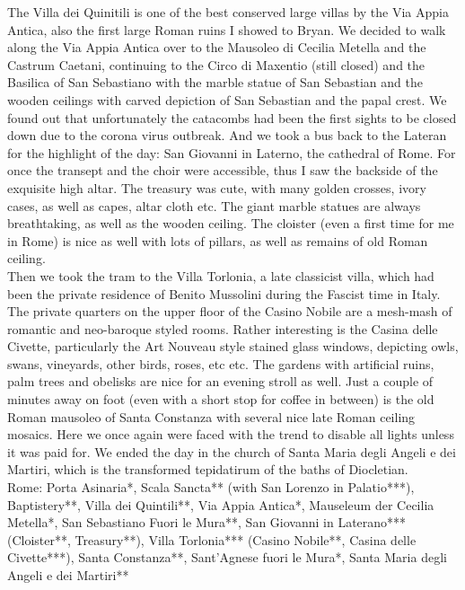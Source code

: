The Villa dei Quinitili is one of the best conserved large villas by the Via Appia Antica, also the first large Roman ruins I showed to Bryan. We decided to walk along the Via Appia Antica over to the Mausoleo di Cecilia Metella and the Castrum Caetani, continuing to the Circo di Maxentio (still closed) and the Basilica of San Sebastiano with the marble statue of San Sebastian and the wooden ceilings with carved depiction of San Sebastian and the papal crest. We found out that unfortunately the catacombs had been the first sights to be closed down due to the corona virus outbreak. And we took a bus back to the Lateran for the highlight of the day: San Giovanni in Laterno, the cathedral of Rome. For once the transept and the choir were accessible, thus I saw the backside of the exquisite high altar. The treasury was cute, with many golden crosses, ivory cases, as well as capes, altar cloth etc. The giant marble statues are always breathtaking, as well as the wooden ceiling. The cloister (even a first time for me in Rome) is nice as well with lots of pillars, as well as remains of old Roman ceiling.\\
Then we took the tram to the Villa Torlonia, a late classicist villa, which had been the private residence of Benito Mussolini during the Fascist time in Italy. The private quarters on the upper floor of the Casino Nobile are a mesh-mash of romantic and neo-baroque styled rooms. Rather interesting is the Casina delle Civette, particularly the Art Nouveau style stained glass windows, depicting owls, swans, vineyards, other birds, roses, etc etc. The gardens with artificial ruins, palm trees and obelisks are nice for an evening stroll as well. Just a couple of minutes away on foot (even with a short stop for coffee in between) is the old Roman mausoleo of Santa Constanza with several nice late Roman ceiling mosaics. Here we once again were faced with the trend to disable all lights unless it was paid for. We ended the day in the church of Santa Maria degli Angeli e dei Martiri, which is the transformed tepidatirum of the baths of Diocletian.\\

Rome: Porta Asinaria*, Scala Sancta** (with San Lorenzo in Palatio***), Baptistery**, Villa dei Quintili**, Via Appia Antica*, Mauseleum der Cecilia Metella*, San Sebastiano Fuori le Mura**, San Giovanni in Laterano*** (Cloister**, Treasury**), Villa Torlonia*** (Casino Nobile**, Casina delle Civette***), Santa Constanza**, Sant'Agnese fuori le Mura*, Santa Maria degli Angeli e dei Martiri**\\%

